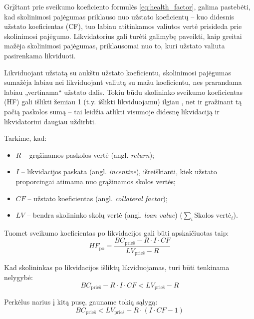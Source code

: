 \documentclass[]{VUMIFTemplateClass}
\begin{document}
Grįžtant prie sveikumo koeficiento formulės \ref{eq:health_factor}, galima pastebėti, kad skolinimosi pajėgumas priklauso nuo užstato koeficientų – kuo didesnis užstato koeficientas (CF), tuo labiau atitinkamos valiutos vertė prisideda prie skolinimosi pajėgumo. Likvidatorius gali turėti galimybę paveikti, kaip greitai mažėja skolinimosi pajėgumas, priklausomai nuo to, kuri užstato valiuta pasirenkama likviduoti. 

Likviduojant užstatą su aukštu užstato koeficientu, skolinimosi pajėgumas sumažėja labiau nei likviduojant valiutą su mažu koeficientu, nes prarandama labiau „vertinama“ užstato dalis. Tokiu būdu skolininko sveikumo koeficientas (HF) gali išlikti žemiau 1 (t.y. išlikti likviduojamu) ilgiau , net ir gražinant tą pačią paskolos sumą – tai leidžia atlikti visumoje didesnę likvidaciją ir likvidatoriui daugiau uždirbti.

Tarkime, kad:
\begin{itemize}
    \item $R$ – grąžinamos paskolos vertė (angl. \textit{return});
    \item $I$ – likvidacijos paskata (angl. \textit{incentive}), išreiškianti, kiek užstato proporcingai atimama nuo grąžinamos skolos vertės;
    \item $CF$ – užstato koeficientas (angl. \textit{collateral factor});
    \item $LV$ – bendra skolininko skolų vertė (angl. \textit{loan value}) ($\sum_{i} \text{Skolos vertė}_{i}$).
\end{itemize}

Tuomet sveikumo koeficientas po likvidacijos gali būti apskaičiuotas taip:
\begin{equation}
    HF_{\text{po}} = \frac{BC_{\text{prieš}} - R \cdot I \cdot CF}{LV_{\text{prieš}} - R}
    \label{eq:health_factor_delta}
\end{equation}

Kad skolininkas po likvidacijos išliktų likviduojamas, turi būti tenkinama nelygybė:
\begin{equation}
    {BC_{\text{prieš}} - R \cdot I \cdot CF} < {LV_{\text{prieš}} - R}
    \label{eq:nesveikumo_inequalinty}
\end{equation}

Perkėlus narius į kitą pusę, gauname tokią sąlygą:
\begin{equation}
    BC_{\text{prieš}} < LV_{\text{prieš}} + R \cdot (I \cdot CF - 1)
    \label{eq:nesveikumo_inequalinty_2}
\end{equation}
\end{document}
